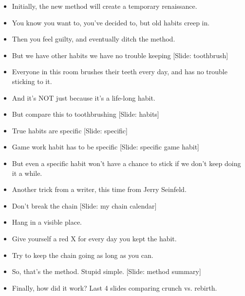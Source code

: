 \documentclass[12pt]{article}
\begin{document}
{\begin{itemize}
\item Initially, the new method will create a temporary renaissance.

\item You know you want to, you've decided to, but old habits creep in.

\item Then you feel guilty, and eventually ditch the method.

\item But we have other habits we have no trouble keeping [Slide: toothbrush]

\item Everyone in this room brushes their teeth every day, and has no trouble sticking to it.

\item And it's NOT just because it's a life-long habit.

\item But compare this to toothbrushing [Slide: habits]

\item True habits are specific [Slide: specific]

\item Game work habit has to be specific [Slide: specific game habit]

\item But even a specific habit won't have a chance to stick if we don't keep doing it a while.


\item Another trick from a writer, this time from Jerry Seinfeld.

\item Don't break the chain [Slide: my chain calendar]

\item Hang in a visible place.

\item Give yourself a red X for every day you kept the habit.

\item Try to keep the chain going as long as you can.

\item So, that's the method.  Stupid simple.  [Slide: method summary]

\item Finally, how did it work?  Last 4 slides comparing crunch vs. rebirth.



\end{itemize}

}
\end{document}
